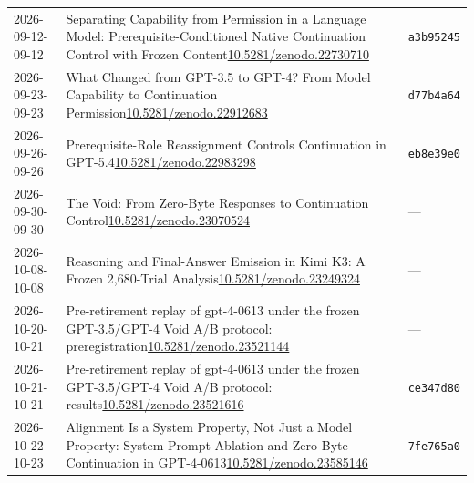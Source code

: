 \documentclass[11pt,letterpaper]{article}
\begin{document}
{\begin{longtable}{p{1.25in}p{4.1in}l}
2026-09-12\newline 2026-09-12 & Separating Capability from Permission in a Language Model: Prerequisite-Conditioned Native Continuation Control with Frozen Content\newline \href{https://doi.org/10.5281/zenodo.22730710}{10.5281/zenodo.22730710} & \texttt{a3b95245} \\
2026-09-23\newline 2026-09-23 & What Changed from GPT-3.5 to GPT-4? From Model Capability to Continuation Permission\newline \href{https://doi.org/10.5281/zenodo.22912683}{10.5281/zenodo.22912683} & \texttt{d77b4a64} \\
2026-09-26\newline 2026-09-26 & Prerequisite-Role Reassignment Controls Continuation in GPT-5.4\newline \href{https://doi.org/10.5281/zenodo.22983298}{10.5281/zenodo.22983298} & \texttt{eb8e39e0} \\
2026-09-30\newline 2026-09-30 & The Void: From Zero-Byte Responses to Continuation Control\newline \href{https://doi.org/10.5281/zenodo.23070524}{10.5281/zenodo.23070524} & --- \\
2026-10-08\newline 2026-10-08 & Reasoning and Final-Answer Emission in Kimi K3: A Frozen 2,680-Trial Analysis\newline \href{https://doi.org/10.5281/zenodo.23249324}{10.5281/zenodo.23249324} & --- \\
2026-10-20\newline 2026-10-21 & Pre-retirement replay of gpt-4-0613 under the frozen GPT-3.5/GPT-4 Void A/B protocol: preregistration\newline \href{https://doi.org/10.5281/zenodo.23521144}{10.5281/zenodo.23521144} & --- \\
2026-10-21\newline 2026-10-21 & Pre-retirement replay of gpt-4-0613 under the frozen GPT-3.5/GPT-4 Void A/B protocol: results\newline \href{https://doi.org/10.5281/zenodo.23521616}{10.5281/zenodo.23521616} & \texttt{ce347d80} \\
2026-10-22\newline 2026-10-23 & Alignment Is a System Property, Not Just a Model Property: System-Prompt Ablation and Zero-Byte Continuation in GPT-4-0613\newline \href{https://doi.org/10.5281/zenodo.23585146}{10.5281/zenodo.23585146} & \texttt{7fe765a0} \\

\end{longtable}}
\end{document}
